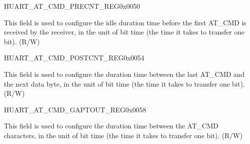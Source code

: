 \begin{register}{H}{UART\_AT\_CMD\_PRECNT\_REG}{0x0050}\label{regdesc:UARTATCMDPRECNTREG}
%
%
\regnewline%
\begin{regdesc}\begin{reglist}
\label{fielddesc:UARTPREIDLENUM}\item [UART\_PRE\_IDLE\_NUM] This field is used to configure the idle duration time before the first AT\_CMD is received by the receiver, in the unit of bit time (the time it takes to transfer one bit). (R/W)
\end{reglist}\end{regdesc}
\end{register}


\begin{register}{H}{UART\_AT\_CMD\_POSTCNT\_REG}{0x0054}\label{regdesc:UARTATCMDPOSTCNTREG}
%
%
\regnewline%
\begin{regdesc}\begin{reglist}
\label{fielddesc:UARTPOSTIDLENUM}\item [UART\_POST\_IDLE\_NUM] This field is used to configure the duration time between the last AT\_CMD and the next data byte, in the unit of bit time (the time it takes to transfer one bit). (R/W)
\end{reglist}\end{regdesc}
\end{register}


\begin{register}{H}{UART\_AT\_CMD\_GAPTOUT\_REG}{0x0058}\label{regdesc:UARTATCMDGAPTOUTREG}
%
%
\regnewline%
\begin{regdesc}\begin{reglist}
\label{fielddesc:UARTRXGAPTOUT}\item [UART\_RX\_GAP\_TOUT] This field is used to configure the duration time between the AT\_CMD characters, in the unit of bit time (the time it takes to transfer one bit). (R/W)
\end{reglist}\end{regdesc}
\end{register}


